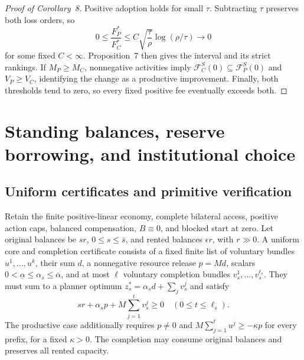 \documentclass[ecta,draft,supplement]{econsocart}
\theoremstyle{definition}
\theoremstyle{definition}
\begin{document}
\begin{appendix}
\begin{proof}[Proof of Corollary~8%
]
Positive adoption holds for small $\tau$. Subtracting $\tau$ preserves
both loss orders, so
\[
 0\leq\frac{F_P^*}{F_C^*}
 \leq C\sqrt{\frac\tau\rho}\log(\rho/\tau)\longrightarrow0
\]
for some fixed $C<\infty$. Proposition~7%
 then
gives the interval and its strict rankings. If $M_P\geq M_C$,
nonnegative activities imply $\mathcal F_C^S(0)\subseteq
\mathcal F_P^S(0)$ and $V_P\geq V_C$, identifying the change as a
productive improvement. Finally, both thresholds tend to zero, so every
fixed positive fee eventually exceeds both.
\end{proof}

\section{Standing balances, reserve borrowing, and institutional choice}
\label{app:standingcapacity}

\subsection{Uniform certificates and primitive verification}

Retain the finite positive-linear economy, complete bilateral access,
positive action caps, balanced compensation, $B\equiv0$, and blocked
start at zero. Let original balances be $sr$, $0\leq s\leq\bar s$,
and rented balances $\epsilon r$, with $r\gg0$. A uniform core and
completion certificate consists of a fixed finite list of voluntary
bundles $u^1,\ldots,u^k$, their sum $d$, a nonnegative resource
release $p=Md$, scalars
$0<\underline\alpha\leq\alpha_s\leq\overline\alpha$, and at most
$\ell$ voluntary completion bundles $v_s^1,\ldots,v_s^{\ell_s}$.
They must sum to a planner optimum
$z_s^*=\alpha_s d+\sum_jv_s^j$ and satisfy
\[
 sr+\alpha_s p+M\sum_{j=1}^t v_s^j\geq0
 \quad(0\leq t\leq\ell_s).
\]
The productive case additionally requires $p\ne0$ and
$M\sum_{j=1}^t u^j\geq-\kappa p$ for every prefix, for a fixed
$\kappa>0$. The completion may consume original balances and preserves all rented capacity.


\end{appendix}
\end{document}
